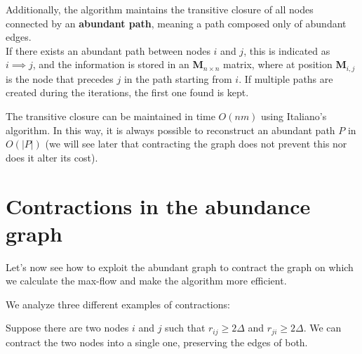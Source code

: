     Additionally, the algorithm maintains the transitive closure of all nodes connected by an \textbf{abundant path}, meaning a path composed only of abundant edges.\\
    If there exists an abundant path between nodes \( i \) and \( j \), this is indicated as \( i \implies j \), and the information is stored in an \textbf{M}$_{n \times n}$ matrix, where at position \textbf{M}$_{i,j}$ is the node that precedes \( j \) in the path starting from \( i \). If multiple paths are created during the iterations, the first one found is kept.

    The transitive closure can be maintained in time \( O(nm) \) using Italiano's algorithm\cite{ITALIANO1986273}. 
    In this way, it is always possible to reconstruct an abundant path \( P \) in \( O(|P|) \) (we will see later that contracting the graph does not prevent this nor does it alter its cost).

\newpage

\section{Contractions in the abundance graph}
Let's now see how to exploit the abundant graph to contract the graph on which we calculate the max-flow and make the algorithm more efficient.

We analyze three different examples of contractions:

Suppose there are two nodes \(i\) and \(j\) such that \(r_{ij} \geq 2\Delta\) and \(r_{ji} \geq 2\Delta\).
We can contract the two nodes into a single one, preserving the edges of both.

